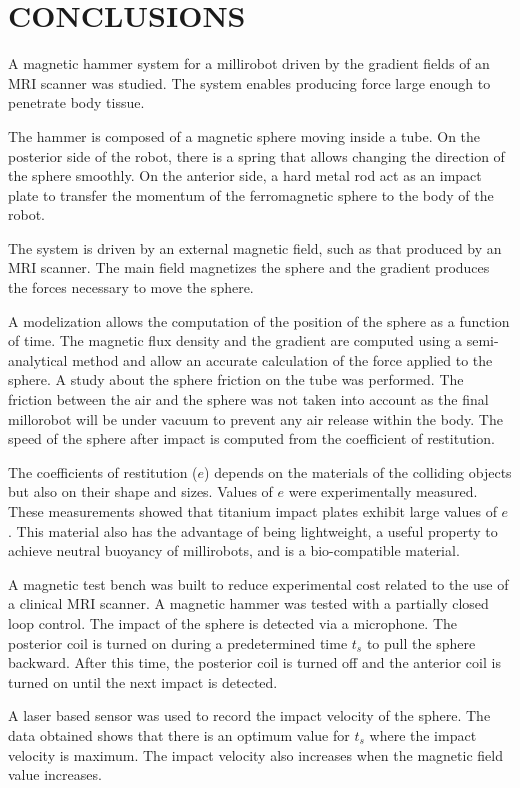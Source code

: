 \documentclass[letterpaper, 10 pt, conference]{ieeeconf}  %
\begin{document}
\section{CONCLUSIONS}
\label{conclusion}
A magnetic hammer system for a millirobot driven by the gradient fields of an MRI scanner was studied. 
The system enables producing force large enough to penetrate body tissue.\par
The hammer is composed of a magnetic sphere moving inside a tube. 
On the posterior side of the robot, there is a spring that allows changing the direction of the sphere smoothly. 
On the anterior side, a hard metal rod act as an impact plate to transfer the momentum of the ferromagnetic sphere to the body of the robot.\par
The system is driven by an external magnetic field, such as that produced by an MRI scanner. 
The main field magnetizes the sphere and the gradient produces the forces necessary to move the sphere.\par
 A modelization allows the computation of the position of the sphere as a function of time. 
 The magnetic flux density and the gradient are computed using a semi-analytical method and allow an accurate calculation of the force applied to the sphere. A study about the sphere friction on the tube was performed. The friction between the air and the sphere was not taken into account as the final millorobot will be under vacuum to prevent any air release within the body.
 The speed of the sphere after impact is computed from the coefficient of restitution. \par
The coefficients of restitution ($e$) depends on the materials of the colliding objects but also on their shape and sizes. 
Values of $e$ were experimentally measured. 
These measurements showed that titanium impact plates exhibit large values of $e$. 
This material also has the advantage of being lightweight, a useful property to achieve neutral buoyancy of millirobots, and is a bio-compatible material.\par
A magnetic test bench was built to reduce experimental cost related to the use of a clinical MRI scanner. 
A magnetic hammer was tested with a partially closed loop control. 
The impact of the sphere is detected via a microphone. 
The posterior coil is turned on during a predetermined time $t_s$ to pull the sphere backward.
 After this time, the posterior coil is turned off and the anterior coil is turned on until the next impact is detected.\par
A laser based sensor was used to record the impact velocity of the sphere. The data obtained shows that there is an optimum value for $t_s$ where the impact velocity is maximum. The impact velocity also increases when the magnetic field value increases.\par
\end{document}
